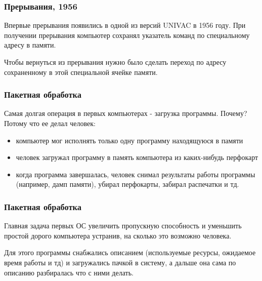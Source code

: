 \begin{frame}
\frametitle{Прерывания, 1956}

Впервые прерывания появились в одной из версий UNIVAC в 1956 году. При получении
прерывания компьютер сохранял указатель команд по специальному адресу в памяти.

Чтобы вернуться из прерывания нужно было сделать переход по адресу сохраненному
в этой специальной ячейке памяти.
\end{frame}

\begin{frame}
\frametitle{Пакетная обработка}

Самая долгая операция в первых компьютерах - загрузка программы. Почему? Потому
что ее делал человек:
\begin{itemize}
  \item компьютер мог исполнять только одну программу находящуюся в памяти
  \item человек загружал программу в память компьютера из каких-нибудь перфокарт
  \item когда программа завершалась, человек снимал результаты работы программы
        (например, дамп памяти), убирал перфокарты, забирал распечатки и тд.
\end{itemize}
\end{frame}

\begin{frame}
\frametitle{Пакетная обработка}

Главная задача первых ОС увеличить пропускную способность и уменьшить простой
дорого компьютера устранив, на сколько это возможно человека.

Для этого программы снабжались описанием (используемые ресурсы, ожидаемое время
работы и тд) и загружались пачкой в систему, а дальше она сама по описанию
разбиралась что с ними делать.
\end{frame}

